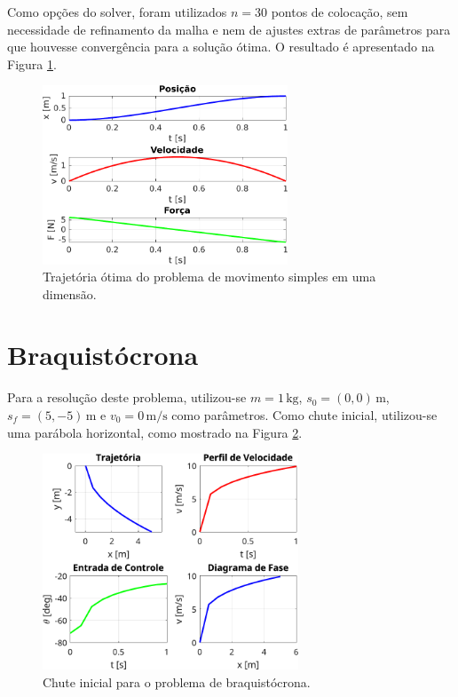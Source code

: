 Como opções do solver, foram utilizados $n=30$ pontos de colocação, sem necessidade de refinamento da malha e nem de ajustes extras de parâmetros para que houvesse convergência para a solução ótima. O resultado é apresentado na Figura \ref{fig:resultados-movimento-simples}.

\begin{figure}[H]
    \centering
    \includegraphics[width=0.65\textwidth]{Cap4/figuras/movimento-simples.pdf}
    \caption{Trajetória ótima do problema de movimento simples em uma dimensão.}
    \label{fig:resultados-movimento-simples}
\end{figure}


\section{Braquistócrona}
\label{sec:resultados-braquistocrona}

Para a resolução deste problema, utilizou-se $m=1 \, \si{\kilo\gram}$, $s_{0}=(0,0) \, \si{\meter}$, $s_{f}=(5,-5) \, \si{\meter}$ e $v_0=0 \, \si{\meter\per\second}$ como parâmetros. Como chute inicial, utilizou-se uma parábola horizontal, como mostrado na Figura \ref{fig:resultados-braquistocrona-chute}.

\begin{figure}[H]
    \centering
    \includegraphics[width=0.68\textwidth]{Cap4/figuras/braquistocrona-chute.pdf}
    \caption{Chute inicial para o problema de braquistócrona.}
    \label{fig:resultados-braquistocrona-chute}
\end{figure}

